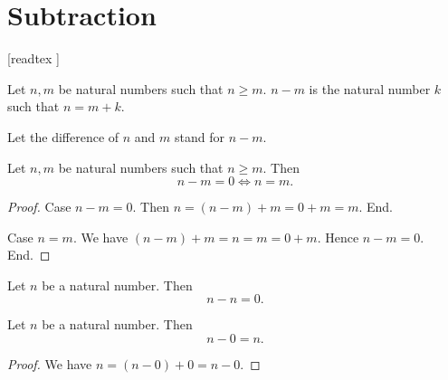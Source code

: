 \documentclass[../arithmetic.tex]{subfiles}
\begin{document}
  \chapter{Subtraction}\label{chapter:subtraction}


  \begin{forthel}

    [readtex ]

  \end{forthel}

  \begin{forthel}
    \begin{definition}
      Let $n, m$ be natural numbers such that $n \geq m$.
      $n \minus m$ is the natural number $k$ such that $n = m \plus k$.
    \end{definition}

    Let the difference of $n$ and $m$ stand for $n \minus m$.
  \end{forthel}

  \begin{forthel}
    \begin{proposition}
      Let $n, m$ be natural numbers such that $n \geq m$.
      Then \[ n \minus m = 0 \iff n = m. \]
    \end{proposition}
    \begin{proof}
      Case $n \minus m = 0$.
        Then $n
          = (n \minus m) \plus m
          = 0 \plus m
          = m$.
      End.

      Case $n = m$.
        We have $(n \minus m) \plus m
          = n
          = m
          = 0 \plus m$.
        Hence $n \minus m = 0$.
      End.
    \end{proof}
  \end{forthel}

  \begin{forthel}
    \begin{corollary}
      Let $n$ be a natural number.
      Then \[ n \minus n = 0. \]
    \end{corollary}
  \end{forthel}

  \begin{forthel}
    \begin{proposition}
      Let $n$ be a natural number.
      Then \[ n \minus 0 = n. \]
    \end{proposition}
    \begin{proof}
      We have $n
        = (n \minus 0) \plus 0
        = n \minus 0$.
    \end{proof}
  \end{forthel}
\end{document}
